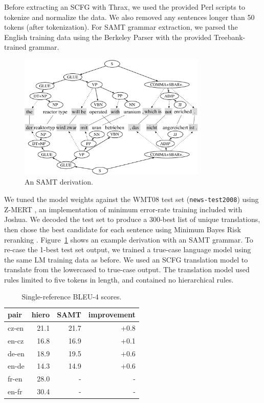 \documentclass[11pt]{article}
\begin{document}
Before extracting an SCFG with Thrax, we used the provided Perl
scripts to tokenize and normalize the data. We also removed any
sentences longer than 50 tokens (after tokenization).  For SAMT
grammar extraction, 
we parsed the English training data using the Berkeley Parser
\cite{petrov2006learning} with the
provided Treebank-trained grammar.

\begin{figure}[t]
  \centering
  \includegraphics[width=0.8\textwidth]{figures/derivation}
  \caption{An SAMT derivation.}
  \label{figure:derivation}
\end{figure}

We tuned the model weights against the WMT08 test set ({\tt news-test2008}) using Z-MERT \cite{zaidan2009z}, an
implementation of minimum error-rate training included with Joshua.  We decoded the test set to produce a 300-best list of unique
translations, then chose the best candidate for each sentence using
Minimum Bayes Risk reranking \cite{kumar2004minimum}.
Figure~\ref{figure:derivation} shows an example derivation with an
SAMT grammar.  To re-case the 1-best test set output, we trained a true-case language
model using the same LM training data as before.  We used an SCFG
translation model to translate from the lowercased to true-case
output.  The translation model used rules limited to five tokens in length, and contained no hierarchical rules. 

\begin{table}[t]
  \centering
  \begin{tabular}{l|rrr}
    pair   & hiero & SAMT & improvement \\
    \hline\hline
    cz-en  & 21.1  & 21.7 & +0.8 \\
    en-cz  & 16.8  & 16.9 & +0.1 \\
    de-en  & 18.9  & 19.5 & +0.6 \\
    en-de  & 14.3  & 14.9 & +0.6 \\
    fr-en  & 28.0  & - & - \\
    en-fr  & 30.4  & - & - \\
  \end{tabular}
  \caption{Single-reference BLEU-4 scores.}
  \label{table:results}
\end{table}
\end{document}
